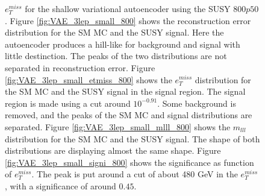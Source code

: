 \begin{figure}[h!]
{    $e_T^{miss}$ for the shallow variational autoencoder using the SUSY $800p50$.
    Figure \ref{fig:VAE_3lep_small_800} shows the reconstruction error 
    distribution for the SM MC and the SUSY signal. Here the autoencoder produces a hill-like for background and 
    signal with little destinction. The peaks of the two distributions are not separated in reconstruction error. Figure \ref{fig:VAE_3lep_small_etmiss_800} 
    shows the $e_T^{miss}$ distribution for the SM MC and the SUSY signal in the signal region. 
    The signal region is made using a cut around $10^{-0.91}$. Some background is removed, and the peaks of the SM MC and signal 
    distributions are separated. Figure \ref{fig:VAE_3lep_small_mlll_800} shows the $m_{lll}$ distribution for the SM MC and the SUSY signal. 
    The shape of both distributions are displaying almost the same shape. Figure \ref{fig:VAE_3lep_small_signi_800} shows the significance as 
    function of $e_T^{miss}$. The peak is put around a cut of about 480 GeV in the $e_T^{miss}$, with a significance of around $0.45$.}
    \label{fig:VAE_3lep_small_rec_sig_signi_800}
\end{figure}


